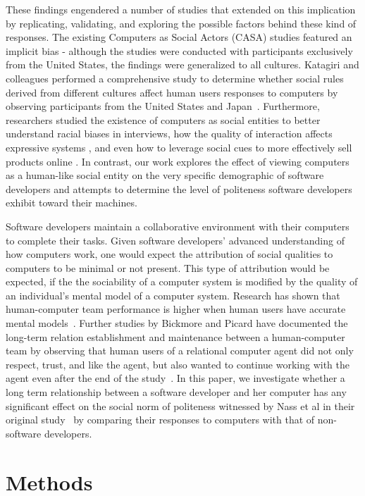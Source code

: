 \documentclass{sig-alternate-05-2015}
\begin{document}
These findings engendered a number of studies that extended on this implication by replicating, validating, and exploring the possible factors behind these kind of responses. The existing Computers as Social Actors (CASA) studies featured an implicit bias - although the studies were conducted with participants exclusively from the United States, the findings were generalized to all cultures. Katagiri and colleagues performed a comprehensive study to determine whether social rules derived from different cultures affect human users responses to computers by observing participants from the United States and Japan~\cite{katagiri2001cross}. Furthermore, researchers studied the existence of computers as social entities to better understand racial biases in interviews\cite{krysan2003race}, how the quality of interaction affects expressive systems \cite{vidyarthi2011sympathetic}, and even how to leverage social cues to more effectively sell products online \cite{wang2007can}. In contrast, our work explores the effect of viewing computers as a human-like social entity on the very specific demographic of software developers and attempts to determine the level of politeness software developers exhibit toward their machines.

Software developers maintain a collaborative environment with their computers to complete their tasks. Given software developers' advanced understanding of how computers work, one would expect the attribution of social qualities to computers to be minimal or not present.  This type of attribution would be expected, if the the sociability of a computer system is modified by the quality of an individual's mental model of a computer system. Research has shown that human-computer team performance is higher when human users have accurate mental models~\cite{wilkison2007effects}. Further studies by Bickmore and Picard have documented the long-term relation establishment and maintenance between a human-computer team by observing that human users of a relational computer agent did not only respect, trust, and like the agent, but also wanted to continue working with the agent even after the end of the study~\cite{Bickmore:2005:EML:1067860.1067867}. In this paper, we investigate whether a long term relationship between a software developer and her computer has any significant effect on the social norm of politeness witnessed by Nass et al in their original study~\cite{nass1999people} by comparing their responses to computers with that of non-software developers.

\section{Methods}
\end{document}
